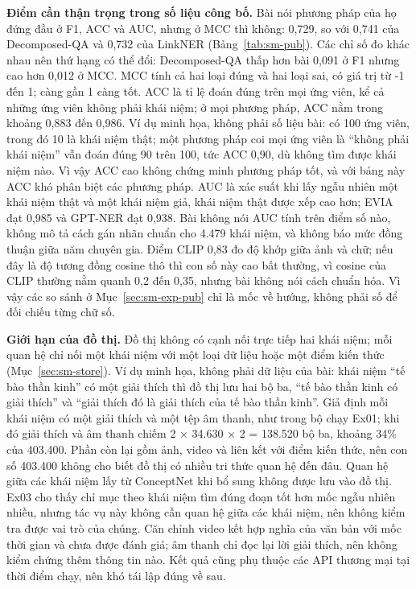 \textbf{Điểm cần thận trọng trong số liệu công bố.}
Bài nói phương pháp của họ đứng đầu ở F1, ACC và AUC, nhưng ở MCC thì không: 0,729, so với 0,741 của Decomposed-QA và 0,732 của LinkNER (Bảng~\ref{tab:sm-pub}).
Các chỉ số đo khác nhau nên thứ hạng có thể đổi: Decomposed-QA thấp hơn bài 0,091 ở F1 nhưng cao hơn 0,012 ở MCC.
MCC tính cả hai loại đúng và hai loại sai, có giá trị từ -1 đến 1; càng gần 1 càng tốt.
ACC là tỉ lệ đoán đúng trên mọi ứng viên, kể cả những ứng viên không phải khái niệm; ở mọi phương pháp, ACC nằm trong khoảng 0,883 đến 0,986.
Ví dụ minh họa, không phải số liệu bài: có 100 ứng viên, trong đó 10 là khái niệm thật; một phương pháp coi mọi ứng viên là ``không phải khái niệm'' vẫn đoán đúng 90 trên 100, tức ACC 0,90, dù không tìm được khái niệm nào.
Vì vậy ACC cao không chứng minh phương pháp tốt, và với bảng này ACC khó phân biệt các phương pháp.
AUC là xác suất khi lấy ngẫu nhiên một khái niệm thật và một khái niệm giả, khái niệm thật được xếp cao hơn; EVIA đạt 0,985 và GPT-NER đạt 0,938.
Bài không nói AUC tính trên điểm số nào, không mô tả cách gán nhãn chuẩn cho 4.479 khái niệm, và không báo mức đồng thuận giữa năm chuyên gia.
Điểm CLIP 0,83 đo độ khớp giữa ảnh và chữ; nếu đây là độ tương đồng cosine thô thì con số này cao bất thường, vì cosine của CLIP thường nằm quanh 0,2 đến 0,35, nhưng bài không nói cách chuẩn hóa.
Vì vậy các so sánh ở Mục~\ref{sec:sm-exp-pub} chỉ là mốc về hướng, không phải số để đối chiếu từng chữ số.

\textbf{Giới hạn của đồ thị.}
Đồ thị không có cạnh nối trực tiếp hai khái niệm; mỗi quan hệ chỉ nối một khái niệm với một loại dữ liệu hoặc một điểm kiến thức (Mục~\ref{sec:sm-store}).
Ví dụ minh họa, không phải dữ liệu của bài: khái niệm ``tế bào thần kinh'' có một giải thích thì đồ thị lưu hai bộ ba, ``tế bào thần kinh có giải thích'' và ``giải thích đó là giải thích của tế bào thần kinh''.
Giả định mỗi khái niệm có một giải thích và một tệp âm thanh, như trong bộ chạy Ex01; khi đó giải thích và âm thanh chiếm 2 × 34.630 × 2 = 138.520 bộ ba, khoảng 34\% của 403.400.
Phần còn lại gồm ảnh, video và liên kết với điểm kiến thức, nên con số 403.400 không cho biết đồ thị có nhiều tri thức quan hệ đến đâu.
Quan hệ giữa các khái niệm lấy từ ConceptNet khi bổ sung không được lưu vào đồ thị.
Ex03 cho thấy chỉ mục theo khái niệm tìm đúng đoạn tốt hơn mốc ngẫu nhiên nhiều, nhưng tác vụ này không cần quan hệ giữa các khái niệm, nên không kiểm tra được vai trò của chúng.
Căn chỉnh video kết hợp nghĩa của văn bản với mốc thời gian và chưa được đánh giá; âm thanh chỉ đọc lại lời giải thích, nên không kiểm chứng thêm thông tin nào.
Kết quả cũng phụ thuộc các API thương mại tại thời điểm chạy, nên khó tái lập đúng về sau.
